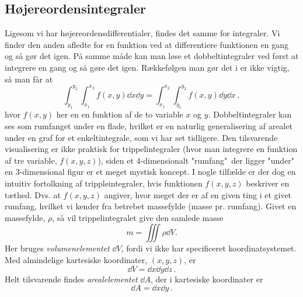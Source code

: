 \subsection{Højereordensintegraler}
Ligesom vi har højereordensdifferentialer, findes det samme for integraler.
Vi finder den anden afledte for en funktion ved at differentiere funktionen en gang og så gør det igen. På samme måde kan man løse et dobbeltintegraler ved først at integrere en gang og så gøre det igen. Rækkefølgen man gør det i er ikke vigtig, så man får at
\begin{equation}
    \int_{y_1}^{y_2}\int_{x_1}^{x_2} f(x,y) \dd{x}\dd{y}=\int_{x_1}^{x_2}\int_{y_1}^{y_2} f(x,y) \dd{y}\dd{x} \, ,
\end{equation}
hvor $f(x,y)$ her en en funktion af de to variable $x$ og $y$.
Dobbeltintegraler kan ses som rumfanget under en flade, hvilket er en naturlig generalisering af arealet under en graf for et enkeltintegrale, som vi har set tidligere.
Den tilsvarende visualisering er ikke praktisk for trippelintegraler (hvor man integrere en funktion af tre variable, $f(x,y,z)$), siden et 4-dimensionalt "rumfang"$\,$ der ligger "under"$\,$ en 3-dimensional figur er et meget mystisk koncept. 
I nogle tilfælde er der dog en intuitiv fortolkning af trippleintegraler, hvis funktionen $f(x,y,z)$ beskriver en tæthed. Dvs. at $f(x,y,z)$ angiver, hvor meget der er af en given ting i et givet rumfang, hvilket vi kender fra betrebet massefylde (masse pr. rumfang).
Givet en massefylde, $\rho$, så vil trippelintegralet give den samlede masse
$$
m=\iiint \rho \dd{V}.
$$
Her bruges \emph{volumenelementet} $\dd V$, fordi vi ikke har specificeret koordinatsystemet. Med almindelige kartesiske koordinater, $(x,y,z)$, er
\begin{equation}
    \dd{V} = \dd{x}\dd{y}\dd{z} \, .
\end{equation}
Helt tilsvarende findes {\em arealelementet} $\dd A$, der i kartesiske koordinater er
\begin{equation}
    \dd{A} = \dd{x}\dd{y} \, .
\end{equation}

